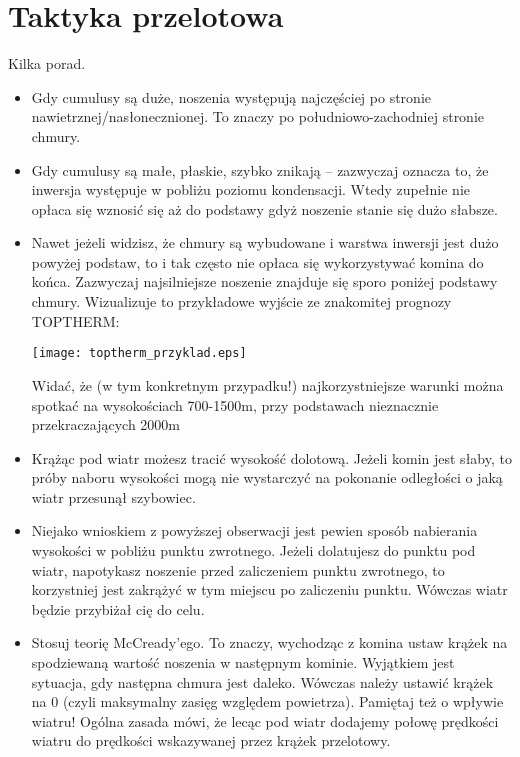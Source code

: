 \documentclass{article}
\begin{document}
\section{Taktyka przelotowa}
Kilka porad.
\begin{itemize}
\item Gdy cumulusy są duże, noszenia występują najczęściej po stronie
    nawietrznej/nasłonecznionej. To znaczy po
    południowo-zachodniej stronie chmury.

\item Gdy cumulusy są małe, płaskie, szybko znikają -- zazwyczaj oznacza
    to, że inwersja występuje w pobliżu poziomu kondensacji. Wtedy zupełnie
    nie opłaca się wznosić się aż do podstawy gdyż noszenie stanie się
    dużo słabsze.

\item Nawet jeżeli widzisz, że chmury są wybudowane i warstwa inwersji jest
    dużo powyżej podstaw, to i tak często nie opłaca się wykorzystywać komina
    do końca. Zazwyczaj najsilniejsze noszenie znajduje się sporo poniżej
    podstawy chmury. Wizualizuje to przykładowe wyjście ze znakomitej
    prognozy TOPTHERM:
    \begin{center}
    \texttt{[image: toptherm\_przyklad.eps]}
    \end{center}
    \noindent
    Widać, że (w tym konkretnym przypadku!) najkorzystniejsze warunki
    można spotkać na wysokościach 700-1500m, przy podstawach
    nieznacznie przekraczających 2000m

\item Krążąc pod wiatr możesz tracić wysokość dolotową. Jeżeli komin jest
    słaby, to próby naboru wysokości mogą nie wystarczyć na pokonanie
    odległości o jaką wiatr przesunął szybowiec. 

\item Niejako wnioskiem z powyższej obserwacji jest pewien sposób nabierania
    wysokości w pobliżu punktu zwrotnego. Jeżeli dolatujesz do punktu
    pod wiatr, napotykasz noszenie przed zaliczeniem punktu zwrotnego,
    to korzystniej jest zakrążyć w tym miejscu po zaliczeniu punktu.
    Wówczas wiatr będzie przybiżał cię do celu.

\item Stosuj teorię McCready'ego. To znaczy, wychodząc z komina ustaw krążek
    na spodziewaną wartość noszenia w następnym kominie. Wyjątkiem jest
    sytuacja, gdy następna chmura jest daleko. Wówczas należy ustawić
    krążek na 0 (czyli maksymalny zasięg względem powietrza).
    Pamiętaj też o wpływie wiatru!
    Ogólna zasada mówi, że lecąc pod wiatr dodajemy połowę prędkości
    wiatru do prędkości wskazywanej przez krążek przelotowy.


\end{itemize}
\end{document}
